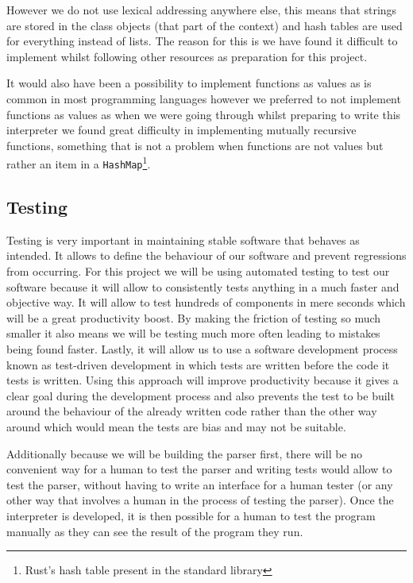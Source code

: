\documentclass{article}
\begin{document}
However we do not use lexical addressing anywhere else, this means that strings
are stored in the class objects (that part of the context) and hash tables are
used for everything instead of lists. The reason for this is we have found it
difficult to implement whilst following other resources as preparation for this
project.

It would also have been a possibility to implement functions as values as is
common in most programming languages however we preferred to not implement
functions as values as when we were going through  whilst
preparing to write this interpreter we found great difficulty in implementing
mutually recursive functions, something that is not a problem when functions
are not values but rather an item in a \texttt{HashMap}\footnote{Rust's hash
table present in the standard library}.

\subsection{Testing}

Testing is very important in maintaining stable software that behaves as
intended. It allows to define the behaviour of our software and prevent
regressions from occurring. For this project we will be using automated testing
to test our software because it will allow to consistently tests anything in a
much faster and objective way. It will allow to test hundreds of components in
mere seconds which will be a great productivity boost. By making the friction
of testing so much smaller it also means we will be testing much more often
leading to mistakes being found faster. Lastly, it will allow us to use a
software development process known as test-driven development in which tests
are written before the code it tests is written. Using this approach will
improve productivity because it gives a clear goal during the development
process and also prevents the test to be built around the behaviour of the
already written code rather than the other way around which would mean the
tests are bias and may not be suitable.

Additionally because we will be building the parser first, there will be no
convenient way for a human to test the parser and writing tests would allow to
test the parser, without having to write an interface for a human tester (or
any other way that involves a human in the process of testing the parser). Once
the interpreter is developed, it is then possible for a human to test the
program manually as they can see the result of the program they run.
\end{document}
